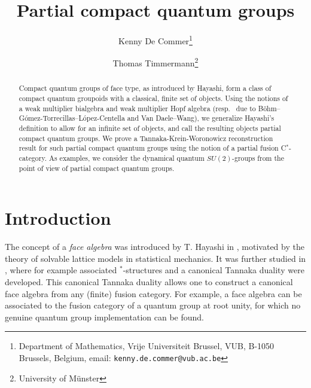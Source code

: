 \documentclass[10pt]{article}
\date{}
\theoremstyle{definition}
\numberwithin{equation}{section}
\begin{document}
\title{Partial compact quantum groups}

\author{Kenny De Commer\thanks{Department of Mathematics, Vrije Universiteit Brussel, VUB, B-1050 Brussels, Belgium, email: {\tt kenny.de.commer@vub.ac.be}}
\and Thomas Timmermann\thanks{University of M\"{u}nster}}

\maketitle

\begin{abstract}
\noindent Compact quantum groups of face type, as introduced by
Hayashi, form a class of compact quantum groupoids with a classical,
finite set of objects. Using the notions of a weak multiplier bialgebra
and weak multiplier Hopf algebra (resp.~ due to
B{\"o}hm--G\'{o}mez-Torrecillas--L\'{o}pez-Centella and Van
Daele--Wang), we generalize Hayashi's definition to allow for an
infinite set of objects, and call the resulting objects partial
compact quantum groups. We prove a Tannaka-Krein-Woronowicz
reconstruction result for such partial compact quantum groups using
the notion of a partial fusion C$^*$-category. As examples, we consider the dynamical quantum $SU(2)$-groups from the point of view of partial compact quantum groups.
\end{abstract}







\tableofcontents

\section*{Introduction}

The concept of  a \emph{face algebra} was introduced by T. Hayashi in \cite{Hay2}, motivated by the theory of solvable lattice models in statistical mechanics. It was further studied in \cite{Hay1,Hay3,Hay4,Hay5,Hay6,Hay7,Hay8}, where for example associated $^*$-structures and a canonical Tannaka duality were developed. This canonical Tannaka duality allows one to construct a canonical face algebra from any (finite) fusion category. For example, a face algebra can be associated to the fusion category of a quantum group at root unity, for which no genuine quantum group implementation can be found. 
\end{document}
